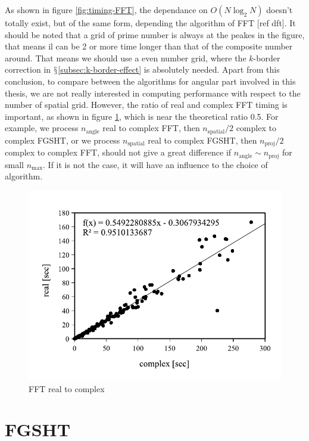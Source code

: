 As shown in figure \ref{fig:timing-FFT}, the dependance on $O(N\log_{2}N)$
\textcolor{red}{\scriptsize{}\citep{Numerical_Recipes_3ed}} doesn't
totally exist, but of the same form, depending the algorithm of FFT
{[}ref dft{]}. It should be noted that a grid of prime number is always
at the peakes in the figure, that means il can be 2 or more time longer
than that of the composite number around. That means we should use
a even number grid, where the $k$-border correction in $\mathsection$\ref{subsec:k-border-effect}
is absolutely needed. Apart from this conclusion, to compare between
the algorithms for angular part involved in this thesis, we are not
really interested in computing performance with respect to the number
of spatial grid. However, the ratio of real and complex FFT timing
is important, as shown in figure \ref{fig:fft-real-to-complex}, which
is near the theoretical ratio 0.5. For example, we process $n_{\mathrm{angle}}$
real to complex FFT, then $n_{\mathrm{spatial}}/2$ complex to complex
FGSHT, or we process $n_{\mathrm{spatial}}$ real to complex FGSHT,
then $n_{\mathrm{proj}}/2$ complex to complex FFT, should not give
a great difference if $n_{\mathrm{angle}}\sim n_{\mathrm{proj}}$
for small $n_{\max}$. If it is not the case, it will have an influence
to the choice of algorithm.
\begin{center}
\begin{figure}[h]
\begin{centering}
\includegraphics[bb=0bp 20bp 340bp 235bp,width=0.5\columnwidth]{_figure/results/fftw_real_v_cmplx}
\par\end{centering}
\caption{FFT real to complex\label{fig:fft-real-to-complex}}
\end{figure}
\par\end{center}

\section{FGSHT}

